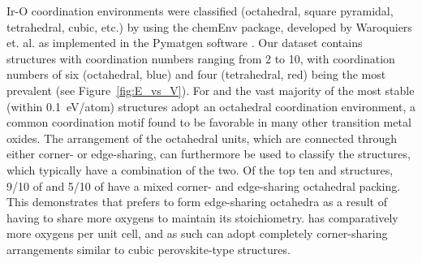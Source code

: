 %
Ir-O coordination environments were classified
(octahedral, square pyramidal, tetrahedral, cubic, etc.)
by using the chemEnv package, developed by Waroquiers et. al. \cite{Waroquiers2017} as implemented in the Pymatgen software \cite{Ong2013}.
%
Our dataset contains structures with coordination numbers ranging from 2 to 10,
with coordination numbers of six (octahedral, blue) and four (tetrahedral, red) being the most prevalent (see Figure~\ref{fig:E_vs_V}).
%
For \IrOtwo and \IrOthree the vast majority of the most stable (within \SI{0.1}{\electronvolt}/atom) structures adopt an octahedral coordination environment,
a common coordination motif found to be favorable in many other transition metal oxides.\cite{Waroquiers2017}
%
The arrangement of the octahedral units, which are connected through either corner- or edge-sharing,
can furthermore be used to classify the structures,
which typically have a combination of the two.
%
Of the top ten \IrOtwo and \IrOthree structures, \num{9/10} of \IrOtwo and \num{5/10} of \IrOthree have a mixed corner- and edge-sharing octahedral packing.
%
This demonstrates that \IrOtwo prefers to form edge-sharing octahedra as a result of having to share more oxygens to maintain its stoichiometry.
%
\IrOthree has comparatively more oxygens per unit cell, and as such can adopt completely corner-sharing arrangements similar to cubic perovskite-type structures.


